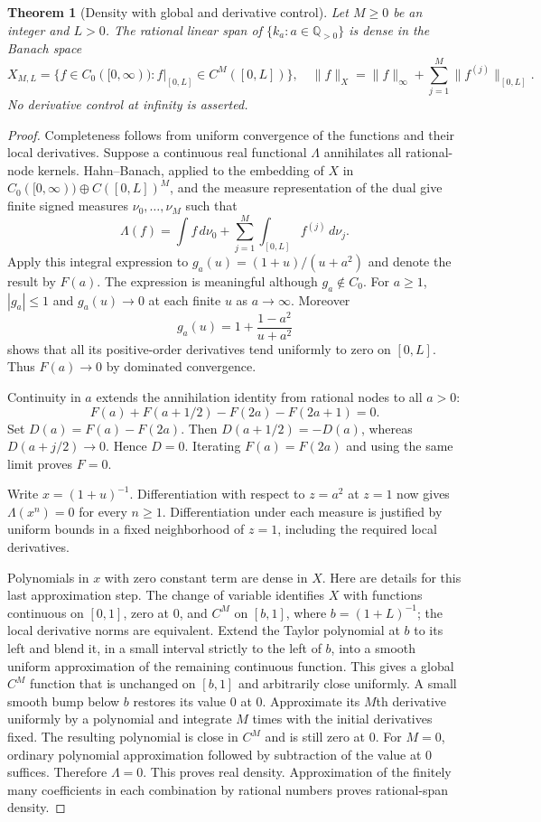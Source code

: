 \documentclass[11pt,a4paper]{article}
\newtheorem{theorem}{Theorem}[section]
\theoremstyle{definition}
\theoremstyle{remark}
\begin{document}
\begin{theorem}[Density with global and derivative control]
\label{sea-analytic-density}
Let $M\geq0$ be an integer and $L>0$. The rational linear span of
$\{k_a:a\in\mathbb Q_{>0}\}$ is dense in the Banach space
\[
X_{M,L}=\{f\in C_0([0,\infty)):f|_{[0,L]}\in C^M([0,L])\},
\quad
\|f\|_X=\|f\|_\infty+\sum_{j=1}^M\|f^{(j)}\|_{[0,L]}.
\]
No derivative control at infinity is asserted.
\end{theorem}

\begin{proof}
Completeness follows from uniform convergence of the functions and their
local derivatives. Suppose a continuous real functional $\Lambda$ annihilates
all rational-node kernels. Hahn--Banach, applied to the embedding of $X$
in $C_0([0,\infty))\oplus C([0,L])^M$, and the measure representation of
the dual give finite signed measures $\nu_0,\ldots,\nu_M$ such that
\[
\Lambda(f)=\int f\,d\nu_0+
\sum_{j=1}^M\int_{[0,L]}f^{(j)}\,d\nu_j.
\]
Apply this integral expression to $g_a(u)=(1+u)/(u+a^2)$ and denote the
result by $F(a)$. The expression is meaningful although $g_a\notin C_0$.
For $a\geq1$, $|g_a|\leq1$ and $g_a(u)\to0$ at each finite $u$ as
$a\to\infty$. Moreover
\[
g_a(u)=1+\frac{1-a^2}{u+a^2}
\]
shows that all its positive-order derivatives tend uniformly to zero on
$[0,L]$. Thus $F(a)\to0$ by dominated convergence.

Continuity in $a$ extends the annihilation identity from rational nodes to
all $a>0$:
\[
F(a)+F(a+1/2)-F(2a)-F(2a+1)=0.
\]
Set $D(a)=F(a)-F(2a)$. Then $D(a+1/2)=-D(a)$, whereas
$D(a+j/2)\to0$. Hence $D=0$. Iterating $F(a)=F(2a)$ and using the
same limit proves $F=0$.

Write $x=(1+u)^{-1}$. Differentiation with respect to $z=a^2$ at $z=1$
now gives $\Lambda(x^n)=0$ for every $n\geq1$. Differentiation under
each measure is justified by uniform bounds in a fixed neighborhood of
$z=1$, including the required local derivatives.

Polynomials in $x$ with zero constant term are dense in $X$. Here are
details for this last approximation step. The change of variable identifies
$X$ with functions continuous on $[0,1]$, zero at $0$, and $C^M$ on
$[b,1]$, where $b=(1+L)^{-1}$; the local derivative norms are equivalent.
Extend the Taylor polynomial at $b$ to its left and blend it, in a small
interval strictly to the left of $b$, into a smooth uniform approximation
of the remaining continuous function. This gives a global $C^M$ function
that is unchanged on $[b,1]$ and arbitrarily close uniformly. A small smooth
bump below $b$ restores its value $0$ at $0$. Approximate its $M$th
derivative uniformly by a polynomial and integrate $M$ times with the
initial derivatives fixed. The resulting polynomial is close in $C^M$ and
is still zero at $0$. For $M=0$, ordinary polynomial approximation followed
by subtraction of the value at $0$ suffices. Therefore $\Lambda=0$.
This proves real density. Approximation of the finitely many coefficients
in each combination by rational numbers proves rational-span density.
\end{proof}
\end{document}
